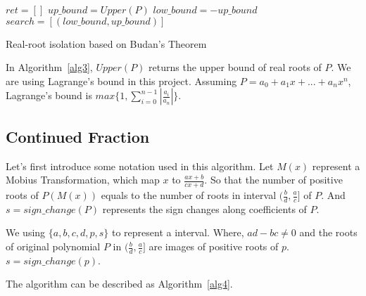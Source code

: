 \begin{algorithm}[H]
\label{alg3}
\SetAlgoLined


  $ret = []$\;
  $up\_bound = Upper(P)$\;
  $low\_bound = - up\_bound$\;
  $search = [(low\_bound, up\_bound)]$\;


  \;
\caption{Real-root isolation based on Budan's Theorem}
\end{algorithm}

In Algorithm~\ref{alg3}, $Upper(P)$ returns the upper bound of real roots of
$P$. We are using Lagrange's bound\cite{Lag} in this project. Assuming $P = a_0 + a_1x +
... + a_nx^n$, Lagrange's bound is $max\{1,
\sum_{i=0}^{n-1}|\frac{a_i}{a_n}|\}$.

\subsection{Continued Fraction}

Let's first introduce some notation used in this algorithm. Let $M(x)$ represent a
Mobius Transformation, which map $x$ to $\frac{ax+b}{cx+d}$. So that the number
of positive
roots of $P(M(x))$ equals to the number of roots in interval $(\frac{b}{d},
\frac{a}{c}]$ of $P$. And $s = sign\_change(P)$ represents the sign changes along
coefficients of $P$.

We using $\{a,b,c,d,p, s\}$ to represent a interval. Where, $ad-bc \neq 0$ and
the roots of original polynomial $P$ in $(\frac{b}{d},\frac{a}{c}]$ are images
of positive roots of $p$. $s = sign\_change(p)$.

The algorithm can be described as Algorithm~\ref{alg4}. 

